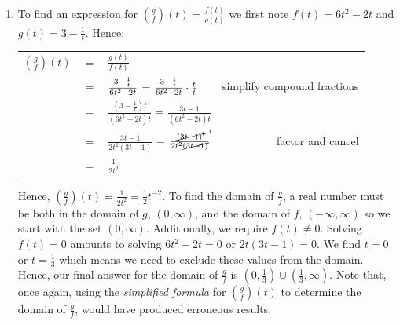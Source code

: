 \documentclass{ximera}
\begin{document}
\begin{example}
\begin{explanation}
\begin{enumerate}
\begin{enumerate}
\item To find an expression for $\left(\frac{g}{f}\right)(t) = \frac{f(t)}{g(t)}$ we first note $f(t) = 6t^2-2t$ and $g(t) = 3 - \frac{1}{t}$.  Hence:
\setlength{\extrarowheight}{12pt}

\begin{longtable}{rclr}
 
$\left( \frac{g}{f}\right)(t)$ & $=$ & $\frac{g(t)}{f(t)} $  & \\
& = & $\frac{3-\frac{1}{t}\vphantom{\left(\frac{1}{t}\right)}}{6t^2 - 2t}$ = $\frac{3-\frac{1}{t}\vphantom{\left(\frac{1}{t}\right)}}{6t^2 - 2t} \cdot \frac{t}{t}$ & simplify compound fractions  \\[.125in]

& = & $\frac{\left(3-\frac{1}{t}\right) t}{\left(6t^2 - 2t\right)t}$ =  $\frac{3t-1}{\left(6t^2 - 2t\right)t}$ & \\

& = & $\frac{3t-1}{2t^2(3t-1)}$ =  $\frac{\cancelto{1}{(3t-1)}}{2t^2\cancel{(3t-1)}}$ & factor and cancel \\

& = & $\frac{1}{2t^2}$ &  \\

\end{longtable} 

\setlength{\extrarowheight}{2pt}

Hence, $\left(\frac{g}{f} \right)(t) = \frac{1}{2t^2} = \frac{1}{2} t^{-2}$.  To find the domain of $\frac{g}{f}$, a real number must be both in the domain of $g$, $(0, \infty)$, and the domain of $f$, $(-\infty, \infty)$ so we start with the set $(0, \infty)$.  Additionally, we require $f(t) \neq 0$.  Solving $f(t) = 0$ amounts to solving $6t^2-2t = 0$ or $2t(3t-1) = 0$.  We find $t = 0$ or $t = \frac{1}{3}$ which means we need to exclude these values from the domain.  Hence, our final answer for the domain of $\frac{g}{f}$ is $\left(0, \frac{1}{3} \right) \cup \left(\frac{1}{3}, \infty \right)$.  Note that, once again,  using the  \textit{simplified formula} for $\left(\frac{g}{f}\right)(t)$ to determine the domain of $\frac{g}{f}$, would have produced erroneous results. 

\end{enumerate}

\end{enumerate}
\end{explanation}

\end{example}
 
\end{document}
